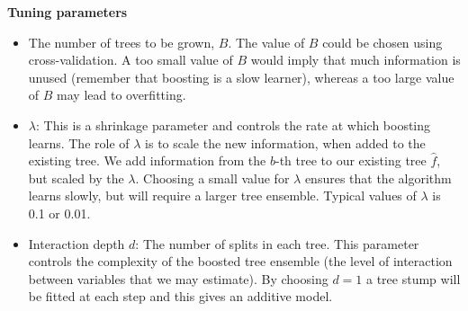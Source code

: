 \documentclass[ignorenonframetext,]{beamer}
\providecommand{\tightlist}{%
  \setlength{\itemsep}{0pt}\setlength{\parskip}{0pt}}
\begin{document}
\begin{frame}

\textbf{Tuning parameters}

\begin{itemize}
\tightlist
\item
  The number of trees to be grown, \(B\). The value of \(B\) could be
  chosen using cross-validation. A too small value of \(B\) would imply
  that much information is unused (remember that boosting is a slow
  learner), whereas a too large value of \(B\) may lead to overfitting.
\item
  \(\lambda\): This is a shrinkage parameter and controls the rate at
  which boosting learns. The role of \(\lambda\) is to scale the new
  information, when added to the existing tree. We add information from
  the \(b\)-th tree to our existing tree \(\hat{f}\), but scaled by the
  \(\lambda\). Choosing a small value for \(\lambda\) ensures that the
  algorithm learns slowly, but will require a larger tree ensemble.
  Typical values of \(\lambda\) is 0.1 or 0.01.
\item
  Interaction depth \(d\): The number of splits in each tree. This
  parameter controls the complexity of the boosted tree ensemble (the
  level of interaction between variables that we may estimate). By
  choosing \(d=1\) a tree stump will be fitted at each step and this
  gives an additive model.
\end{itemize}

\end{frame}
\end{document}
